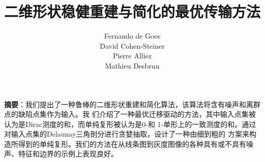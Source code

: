 \title{二维形状稳健重建与简化的最优传输方法}
\author{Fernando de Goes \\ David Cohen-Steiner \\ Pierre Alliez \\ Mathieu Desbrun}
\date{\empty} 
\maketitle

\thispagestyle{empty}

\noindent
\textbf{摘要}：我们提出了一种鲁棒的二维形状重建和简化算法，该算法将含有噪声和离群点的缺陷点集作为输入。我
们介绍了一种最优迁移驱动的方法，其中输入点集被认为是Dirac测度的和，而单纯复形被认为是0-和
1-单形上的一致测度的和。通过对输入点集的Delaunay三角剖分进行贪婪抽取，设计了一种由细到粗的
方案来构造所得到的单纯复形。我们的方法在从线条图到灰度图像的各种具有或不具有噪声、特征和边界的示例上表现良好。
\\
\\
